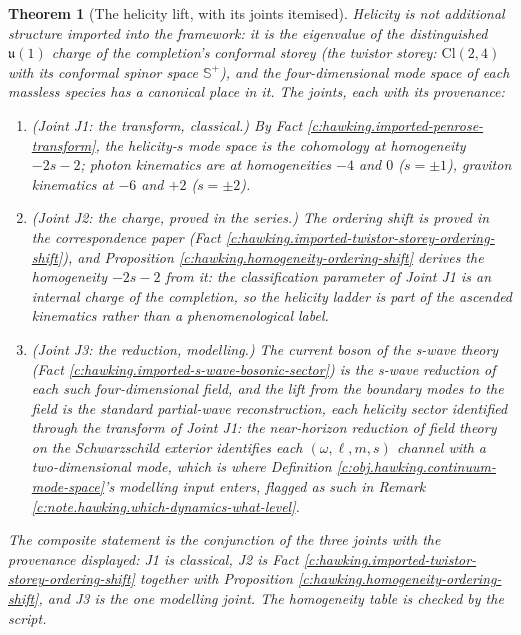 \documentclass[11pt]{article}
\newtheorem{theorem}{Theorem}[section]
\theoremstyle{definition}
\theoremstyle{plain}
\newcommand{\changedmark}[2]{\marginpar{\raggedright\scriptsize\color{#1}#2}}
\providecommand{\CS}{}\renewcommand{\CS}{{\mathbb{S}^{+}}}
\providecommand{\Cl}{}\renewcommand{\Cl}{\mathrm{Cl}}
\begin{document}
\begin{theorem}[The helicity lift, with its joints itemised]\label{c:hawking.helicity-lift-joints-itemised}
\changedmark{gray}{reworded}
Helicity is not additional structure imported into the framework: it is the eigenvalue of the distinguished $\mathfrak{u}(1)$ charge of the completion's conformal storey (the twistor storey: $\Cl(2,4)$ with its conformal spinor space $\CS$), and the four-dimensional mode space of each massless species has a canonical place in it. The joints, each with its provenance:
\begin{enumerate}
\item (\emph{Joint J1: the transform, classical.}) By Fact \ref{c:hawking.imported-penrose-transform}, the helicity-$s$ mode space is the cohomology at homogeneity $-2s-2$; photon kinematics are at homogeneities $-4$ and $0$ ($s = \pm1$), graviton kinematics at $-6$ and $+2$ ($s = \pm2$).
\item (\emph{Joint J2: the charge, proved in the series.}) The ordering shift is proved in the correspondence paper (Fact \ref{c:hawking.imported-twistor-storey-ordering-shift}), and Proposition \ref{c:hawking.homogeneity-ordering-shift} derives the homogeneity $-2s-2$ from it: the classification parameter of Joint J1 is an internal charge of the completion, so the helicity ladder is part of the ascended kinematics rather than a phenomenological label.
\item (\emph{Joint J3: the reduction, modelling.}) The current boson of the s-wave theory (Fact \ref{c:hawking.imported-s-wave-bosonic-sector}) is the s-wave reduction of each such four-dimensional field, and the lift from the boundary modes to the field is the standard partial-wave reconstruction, each helicity sector identified through the transform of Joint J1: the near-horizon reduction of field theory on the Schwarzschild exterior identifies each $(\omega, \ell, m, s)$ channel with a two-dimensional mode, which is where Definition \ref{c:obj.hawking.continuum-mode-space}'s modelling input enters, flagged as such in Remark \ref{c:note.hawking.which-dynamics-what-level}.
\end{enumerate}
The composite statement is the conjunction of the three joints with the provenance displayed: J1 is classical, J2 is Fact \ref{c:hawking.imported-twistor-storey-ordering-shift} together with Proposition \ref{c:hawking.homogeneity-ordering-shift}, and J3 is the one modelling joint. The homogeneity table is checked by the script.
\end{theorem}
\end{document}
